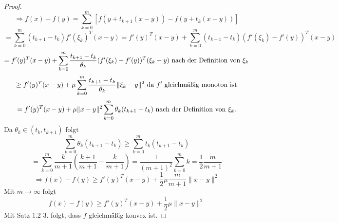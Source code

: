 \begin{proof}
\begin{equation*}
		\end{equation*}
		\begin{displaymath}
		\Rightarrow f(x)-f(y)=\sum_{k=0}^{m}[f(y+t_{k+1}(x-y))-f(y+t_k(x-y))]
		\end{displaymath}
		\begin{displaymath}
		=\sum_{k=0}^{m}(t_{k+1}-t_k)f'(\xi_k)^T(x-y)=f'(y)^T(x-y)+\sum_{k=0}^{m}(t_{k+1}-t_k)(f'(\xi_k)-f'(y))^T(x-y)
		\end{displaymath}
		\begin{displaymath}
		=f'(y)^T(x-y)+\sum_{k=0}^{m} \frac{t_{k+1}-t_k}{\theta_k}(f'(\xi_k)-f'(y))^T(\xi_k-y) \textnormal{ nach der Definition von $\xi_k$}
		\end{displaymath}
		\begin{displaymath}
		\geq f'(y)^T(x-y)+\mu \sum_{k=0}^{m} \frac{t_{k+1}-t_k}{\theta_k} \| \xi_k -y\|^2 \textnormal { da $f'$ gleichmäßig monoton ist}
		\end{displaymath}
		\begin{displaymath}
		= f'(y)^T(x-y)+\mu \|x-y \|^2 \sum_{k=0}^{m} \theta_k(t_{k+1}-t_k) \textnormal{ nach der Definition von $\xi_k$}.
		\end{displaymath}
		Da $\theta_k \in (t_k,t_{k+1})$ folgt
		\begin{displaymath}
		\sum_{k=0}^{m} \theta_k(t_{k+1}-t_k) \geq \sum_{k=0}^{m}t_k(t_{k+1}-t_k)
		\end{displaymath}
		\begin{displaymath}
		=\sum_{k=0}^{m}\frac{k}{m+1}\left(\frac{k+1}{m+1}-\frac{k}{m+1}\right)= \frac{1}{(m+1)^2} \sum_{k=0}^{m}k = \frac{1}{2}\frac{m}{m+1}
		\end{displaymath}
		\begin{displaymath}
		\Rightarrow f(x)-f(y) \geq f'(y)^T(x-y)+\frac{1}{2}\mu\frac {m}{m+1} \| x-y \|^2
		\end{displaymath}
		Mit $m\rightarrow\infty$ folgt
		\begin{displaymath}
		f(x)-f(y) \geq f'(y)^T(x-y)+\frac{1}{2}\mu \| x-y \|^2
		\end{displaymath}
		Mit Satz 1.2 3. folgt, dass $f$ gleichmäßig konvex ist.
	\end{proof}